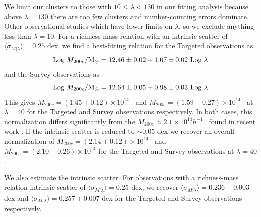 We limit our clusters to those with $10 \leq \lambda < 130$ in our fitting analysis because above $\lambda=130$ there are too few clusters and number-counting errors dominate. Other observational studies  which have lower limits on $\lambda$, so we exclude anything less than $\lambda=10$. For a richness-mass relation with an intrinsic scatter of $\langle \sigma_{M|\lambda} \rangle = 0.25$ dex, we find a best-fitting relation for the Targeted observations as
\begin{equation}
	\mathrm{Log}\ M_{200c}/\hbox{$\mathrm{M}_\odot$} = 12.46\pm0.02 + 1.07\pm0.02\ \mathrm{Log}\ \lambda
\end{equation} 
and the Survey observations as
\begin{equation}
	\mathrm{Log}\ M_{200c}/\Msol = 12.64\pm0.05 + 0.98\pm0.03\ \mathrm{Log}\ \lambda
\end{equation} 
This gives $M_{200c} = (1.45\pm0.12)\times10^{14}$ \Msol\ and $M_{200c} = (1.59\pm0.27)\times10^{14}$ \Msol\ at $\lambda=40$ for the Targeted and Survey observations respectively. In both cases, this normalization differs significantly from the $M_{200c} \approx 2.1\times10^{14} h^{-1}$ \Msol\ found in recent work \cite{Li2016, Simet2016}. If the intrinsic scatter is reduced to $\sim 0.05$ dex we recover an overall normalization of $M_{200c} = (2.14\pm0.12)\times10^{14}$ \Msol\ and $M_{200c} = (2.10\pm0.26)\times10^{14}$ for the Targeted and Survey observations at $\lambda=40$.

We also estimate the intrinsic scatter. For observations with a richness-mass relation intrinsic scatter of $\langle \sigma_{M|\lambda} \rangle = 0.25$ dex, we recover $\langle \sigma_{M|\lambda} \rangle = 0.236\pm0.003$ dex and $\langle \sigma_{M|\lambda} \rangle = 0.257\pm0.007$ dex for the Targeted and Survey observations respectively. 



